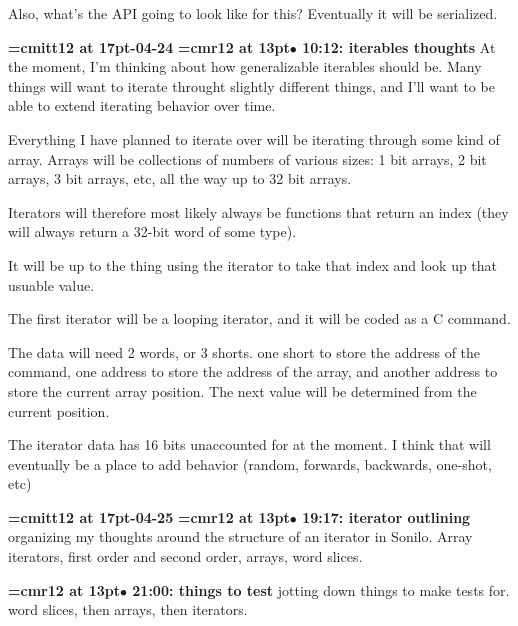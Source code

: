 Also, what's the API going to look like for this? Eventually it will be serialized.
\par

{\medskip\noindent\bf\font\titlefont=cmitt12 at 17pt-04-24}\medskip
{\smallskip\noindent\bf\font\titlefont=cmr12 at 13pt\titlefont $\bullet$ 10:12: iterables thoughts}\smallskip
At the moment, I'm thinking about how generalizable iterables should be. Many things will want to iterate throught slightly different things, and I'll want to be able to extend iterating behavior over time.
\par

Everything I have planned to iterate over will be iterating through some kind of array. Arrays will be collections of numbers of various sizes: 1 bit arrays, 2 bit arrays, 3 bit arrays, etc, all the way up to 32 bit arrays.
\par

Iterators will therefore most likely always be functions that return an index (they will always return a 32-bit word of some type).
\par

It will be up to the thing using the iterator to take that index and look up that usuable value.
\par

The first iterator will be a looping iterator, and it will be coded as a C command.
\par

The data will need 2 words, or 3 shorts. one short to store the address of the command, one address to store the address of the array, and another address to store the current array position. The next value will be determined from the current position.
\par

The iterator data has 16 bits unaccounted for at the moment. I think that will eventually be a place to add behavior  (random, forwards, backwards, one-shot, etc)
\par

{\medskip\noindent\bf\font\titlefont=cmitt12 at 17pt-04-25}\medskip
{\smallskip\noindent\bf\font\titlefont=cmr12 at 13pt\titlefont $\bullet$ 19:17: iterator outlining}\smallskip
organizing my thoughts around the structure of an iterator in Sonilo. Array iterators, first order and second order, arrays, word slices.
\par

{\smallskip\noindent\bf\font\titlefont=cmr12 at 13pt\titlefont $\bullet$ 21:00: things to test}\smallskip
jotting down things to make tests for. word slices, then arrays, then iterators.
\par

